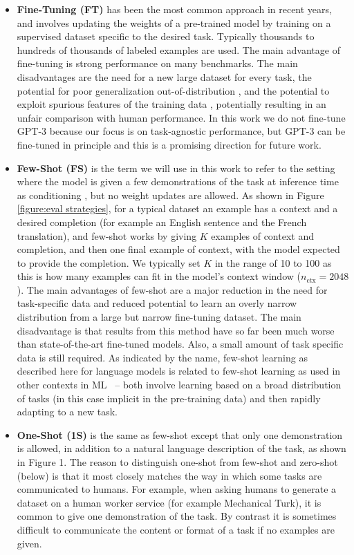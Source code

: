 \documentclass{article}
\begin{document}
\begin{itemize}
    \item \textbf{Fine-Tuning (FT)} has been the most common approach in recent years, and involves updating the weights of a pre-trained model by training on a supervised dataset specific to the desired task.  Typically thousands to hundreds of thousands of labeled examples are used.  The main advantage of fine-tuning is strong performance on many benchmarks. The main disadvantages are the need for a new large dataset for every task, the potential for poor generalization out-of-distribution \cite{mccoy2019right}, and the potential to exploit spurious features of the training data \cite{ gururangan2018annotation, niven2019probing}, potentially resulting in an unfair comparison with human performance. In this work we do not fine-tune GPT-3 because our focus is on task-agnostic performance, but GPT-3 can be fine-tuned in principle and this is a promising direction for future work.
    \item \textbf{Few-Shot (FS)} is the term we will use in this work to refer to the setting where the model is given a few demonstrations of the task at inference time as conditioning \cite{radford2019language}, but no weight updates are allowed.  As shown in Figure \ref{figure:eval strategies}, for a typical dataset an example has a context and a desired completion (for example an English sentence and the French translation), and few-shot works by giving $K$ examples of context and completion, and then one final example of context, with the model expected to provide the completion.  We typically set $K$ in the range of 10 to 100 as this is how many examples can fit in the model’s context window ($n_{\mathrm{ctx}}=2048$).  The main advantages of few-shot are a major reduction in the need for task-specific data and reduced potential to learn an overly narrow distribution from a large but narrow fine-tuning dataset. The main disadvantage is that results from this method have so far been much worse than state-of-the-art fine-tuned models.  Also, a small amount of task specific data is still required. As indicated by the name, few-shot learning as described here for language models is related to few-shot learning as used in other contexts in ML~\citep{hochreiter2001learning, vinyals2016matching} -- both involve learning based on a broad distribution of tasks (in this case implicit in the pre-training data) and then rapidly adapting to a new task.
    \item \textbf{One-Shot (1S)} is the same as few-shot except that only one demonstration is allowed, in addition to a natural language description of the task, as shown in Figure 1. The reason to distinguish one-shot from few-shot and zero-shot (below) is that it most closely matches the way in which some tasks are communicated to humans.  For example, when asking humans to generate a dataset on a human worker service (for example Mechanical Turk), it is common to give one demonstration of the task.  By contrast it is sometimes difficult to communicate the content or format of a task if no examples are given.

\end{itemize}
\end{document}
